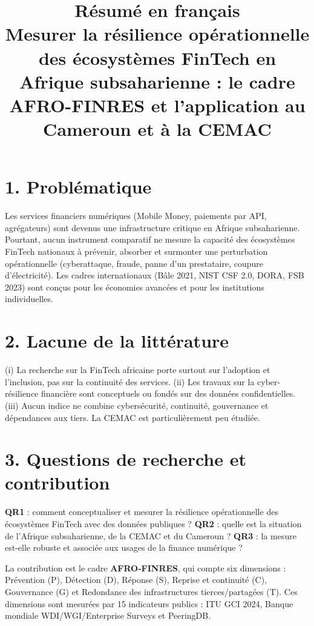 \documentclass[11pt,a4paper]{article}
\title{\textbf{Résumé en français}\\\large Mesurer la résilience opérationnelle des écosystèmes FinTech en Afrique subsaharienne : le cadre AFRO-FINRES et l'application au Cameroun et à la CEMAC}
\date{}
\begin{document}
\sloppy\maketitle
\section*{1. Problématique}
Les services financiers numériques (Mobile Money, paiements par API, agrégateurs) sont devenus une infrastructure critique en Afrique subsaharienne. Pourtant, aucun instrument comparatif ne mesure la capacité des écosystèmes FinTech nationaux à prévenir, absorber et surmonter une perturbation opérationnelle (cyberattaque, fraude, panne d'un prestataire, coupure d'électricité). Les cadres internationaux (Bâle 2021, NIST CSF 2.0, DORA, FSB 2023) sont conçus pour les économies avancées et pour les institutions individuelles.

\section*{2. Lacune de la littérature}
(i) La recherche sur la FinTech africaine porte surtout sur l'adoption et l'inclusion, pas sur la continuité des services. (ii) Les travaux sur la cyber-résilience financière sont conceptuels ou fondés sur des données confidentielles. (iii) Aucun indice ne combine cybersécurité, continuité, gouvernance et dépendances aux tiers. La CEMAC est particulièrement peu étudiée.

\section*{3. Questions de recherche et contribution}
\textbf{QR1} : comment conceptualiser et mesurer la résilience opérationnelle des écosystèmes FinTech avec des données publiques ? \textbf{QR2} : quelle est la situation de l'Afrique subsaharienne, de la CEMAC et du Cameroun ? \textbf{QR3} : la mesure est-elle robuste et associée aux usages de la finance numérique ?

La contribution est le cadre \textbf{AFRO-FINRES}, qui compte six dimensions : Prévention (P), Détection (D), Réponse (S), Reprise et continuité (C), Gouvernance (G) et Redondance des infrastructures tierces/partagées (T). Ces dimensions sont mesurées par 15 indicateurs publics : ITU GCI 2024, Banque mondiale WDI/WGI/Enterprise Surveys et PeeringDB.
\end{document}
